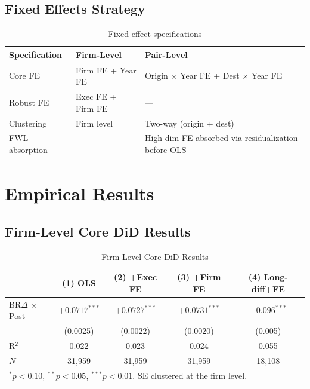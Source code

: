 \documentclass[11pt,a4paper]{article}
\begin{document}
\subsection{Fixed Effects Strategy}

\begin{table}[h!]
\centering
\begin{tabular}{p{2.5cm}p{5cm}p{5cm}}
\toprule
\textbf{Specification} & \textbf{Firm-Level} & \textbf{Pair-Level} \\
\midrule
Core FE & Firm FE + Year FE & Origin \(\times\) Year FE + Dest \(\times\) Year FE \\
Robust FE & Exec FE + Firm FE & — \\
Clustering & Firm level & Two-way (origin + dest) \\
FWL absorption & — & High-dim FE absorbed via residualization before OLS \\
\bottomrule
\end{tabular}
\caption{Fixed effect specifications}
\end{table}

\newpage

\section{Empirical Results}

\subsection{Firm-Level Core DiD Results}

\begin{table}[h!]
\centering
\begin{tabular}{lcccc}
\toprule
 & \textbf{(1) OLS} & \textbf{(2) +Exec FE} & \textbf{(3) +Firm FE} & \textbf{(4) Long-diff+FE} \\
\midrule
BR\(\Delta\) \(\times\) Post & \(+0.0717^{***}\) & \(+0.0727^{***}\) & \(+0.0731^{***}\) & \(+0.096^{***}\) \\
 & (0.0025) & (0.0022) & (0.0020) & (0.005) \\
R\(^2\) & 0.022 & 0.023 & 0.024 & 0.055 \\
\(N\) & 31,959 & 31,959 & 31,959 & 18,108 \\
\midrule
\multicolumn{5}{l}{\footnotesize \(^{*}p<0.10\), \(^{**}p<0.05\), \(^{***}p<0.01\). SE clustered at the firm level.} \\
\bottomrule
\end{tabular}
\caption{Firm-Level Core DiD Results}
\end{table}
\end{document}
